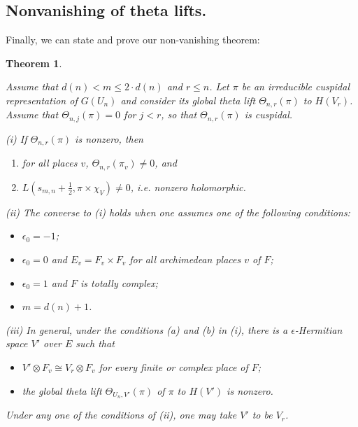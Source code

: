 \documentclass[10pt]{amsart}
\theoremstyle{plain}
\newtheorem{Thm}[equation]{Theorem}
\numberwithin{equation}{section}
\begin{document}
 
  \subsection{\bf Nonvanishing of theta lifts.}
 Finally, we can state and prove our non-vanishing theorem:
 \begin{Thm}\label{T:main_nonvanishing}
 
  Assume that $d(n) < m \leq  2 \cdot d(n)$ and $r \leq n$.
Let $\pi$ be  an irreducible  cuspidal representation of $G(U_n)$ and consider its
global theta lift $\Theta_{n,r}(\pi)$ to $H(V_r)$. Assume that
$\Theta_{n,j}(\pi) = 0$ for $j < r$, so that  $\Theta_{n,r}(\pi)$   
 is cuspidal.  
 \vskip 5pt
 
 \noindent (i)  If $\Theta_{n,r}(\pi)$ is nonzero, then
 \begin{enumerate}
\item[(a)] for all places $v$, $\Theta_{n,r}(\pi_v) \ne 0$, and
\item[(b)] $L(s_{m,n} + \frac{1}{2}, \pi \times \chi_V)\ne  0$, i.e. nonzero holomorphic.  
\end{enumerate}
\vskip 10pt

\noindent (ii) The converse to (i) holds when one assumes one of the following conditions:
 \begin{itemize}
 \item  $\epsilon_0 = -1$;
 \item  $\epsilon_0 = 0$  and $E_v = F_v \times F_v$ for all archimedean places $v$ of $F$;
 \item  $\epsilon_0 = 1$ and $F$ is totally complex;
 \item $m = d(n)+1$.
 \end{itemize}
 
 \vskip 5pt
 
 \noindent (iii) In general, under the conditions (a) and (b) in (i),
 there is a $\epsilon$-Hermitian space $V'$ over $E$ such that 
 \begin{itemize}
 \item  $V' \otimes F_v \cong V_r \otimes F_v$  for every finite or complex place of $F$;
 \item  the global theta lift $\Theta_{U_n, V'}(\pi)$ of $\pi$ to $H(V')$ is nonzero.  
 \end{itemize}
 Under any one of the conditions of (ii), one may take $V'$ to be $V_r$.
\end{Thm}
  
\vskip 5pt
\end{document}
